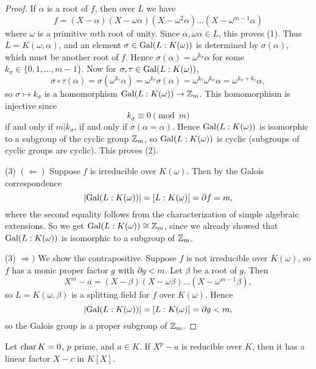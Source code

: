 \begin{proof}
  If $\alpha$ is a root of $f$, then over $L$ we have
  \[
    f = (X - \alpha)(X - \omega \alpha)(X - \omega^2 \alpha) \dots (X - \omega^{m - 1} \alpha)
  \]
  where $\omega$ is a primitive $m$th root of unity.
  Since $\alpha, \omega \alpha \in L$, this proves (1).
  Thus $L = K(\omega, \alpha)$, and an element
  $\sigma \in \operatorname{Gal}(L : K(\omega))$ is determined by
  $\sigma(\alpha)$, which must be another root of $f$.
  Hence $\sigma(\alpha) = \omega^{k_\sigma} \alpha$ for some
  $k_\sigma \in \{0, 1, \dots, m - 1\}$.
  Now for $\sigma, \tau \in \operatorname{Gal}(L : K(\omega))$,
  \[
    \sigma \circ \tau (\alpha)
    = \sigma(\omega^{k_\tau} \alpha)
    = \omega^{k_\tau} \sigma(\alpha)
    = \omega^{k_\tau} \omega^{k_\sigma} \alpha
    = \omega^{k_\sigma + k_\tau} \alpha,
  \]
  so $\sigma \mapsto k_\sigma$ is a homomorphism
  $\operatorname{Gal}(L : K(\omega)) \to \mathbb{Z}_m$. This homomorphism is
  injective since
  \[k_\sigma \equiv 0 \pmod{m}\]
  if and only if $m | k_\sigma$,
  if and only if $\sigma(\alpha = \alpha)$. Hence
  $\operatorname{Gal}(L : K(\omega))$ is isomorphic to a subgroup of
  the cyclic group $\mathbb{Z}_m$, so $\operatorname{Gal}(L : K(\omega))$
  is cyclic (subgroups of cyclic groups are cyclic).
  This proves (2).

  (3) $(\Leftarrow)$ Suppose $f$ is irreducible
  over $K(\omega)$. Then by the Galois correspondence
  \[
    |{\operatorname{Gal}(L : K(\omega))}|
    = [L : K(\omega)]
    = \partial f = m,
  \]
  where the second equality follows from the
  characterization of simple algebraic extensions.
  So we get $\operatorname{Gal}(L : K(\omega)) \cong \mathbb{Z}_m$, since we
  already showed that $\operatorname{Gal}(L : K(\omega))$ is
  isomorphic to a subgroup of $\mathbb{Z}_m$.

  (3) $\Rightarrow)$ We show the contrapositive. Suppose
  $f$ is not irreducible over $K(\omega)$, so
  $f$ has a monic proper factor $g$ with $\partial g < m$.
  Let $\beta$ be a root of $g$. Then
  \[
    X^m - a = (X - \beta)(X - \omega \beta) \dots (X - \omega^{m - 1} \beta),
  \]
  so $L = K(\omega, \beta)$ is a splitting field for
  $f$ over $K(\omega)$. Hence
  \[
    |{\operatorname{Gal}(L : K(\omega))}|
    = [L : K(\omega)]
    = \partial g
    < m,
  \]
  so the Galois group is a proper subgroup of $\mathbb{Z}_m$.
\end{proof}

\begin{theorem}
  Let $\operatorname{char} K = 0$, $p$ prime, and $a \in K$.
  If $X^p - a$ is reducible over $K$, then it has a
  linear factor $X - c$ in $K[X]$.
\end{theorem}

